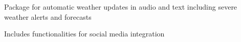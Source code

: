 \documentclass{acmresume}
\begin{document}
        \begin{titemize}
            \item Package for automatic weather updates in audio and text including severe weather alerts and forecasts
            \item Includes functionalities for social media integration
        \end{titemize}

	
\end{document}
